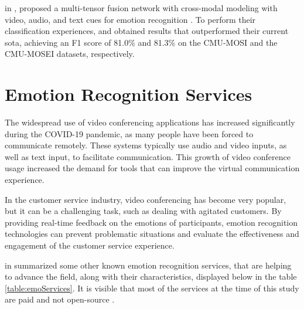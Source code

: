 \citeauthor{Yan2021} in \citeyear{Yan2021}, proposed a multi-tensor fusion network with cross-modal modeling with video, audio, and text cues for emotion recognition \cite{Yan2021}. To perform their classification experiences, and obtained results that outperformed their current \ac{sota}, achieving an F1 score of 81.0\% and 81.3\% on the CMU-MOSI and the CMU-MOSEI datasets, respectively.

\section{Emotion Recognition Services}

The widespread use of video conferencing applications has increased significantly during the COVID-19 pandemic, as many people have been forced to communicate remotely. These systems typically use audio and video inputs, as well as text input, to facilitate communication. This growth of video conference usage increased the demand for tools that can improve the virtual communication experience.

In the customer service industry, video conferencing has become very popular, but it can be a challenging task, such as dealing with agitated customers. By providing real-time feedback on the emotions of participants, emotion recognition technologies can prevent problematic situations and evaluate the effectiveness and engagement of the customer service experience.

\citeauthor{Buitelaar2018} in \citeyear{Buitelaar2018} summarized some other known emotion recognition services, that are helping to advance the field, along with their characteristics, displayed below in the table \ref{table:emoServices}. It is visible that most of the services at the time of this study are paid and not open-source \cite{Buitelaar2018}.

